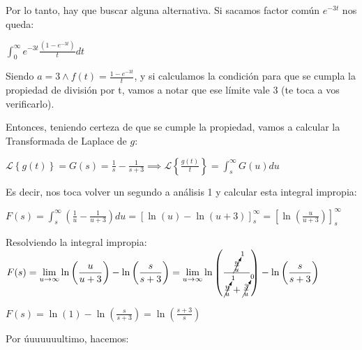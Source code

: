 \documentclass[11pt]{article}
\newcommand{\lapl}[1]{\mathscr{L} \left\lbrace {#1} \right\rbrace}
\begin{document}
	Por lo tanto, hay que buscar alguna alternativa. Si sacamos factor común $e^{-3t}$ nos queda:
	
	$\displaystyle \int_{0}^{\infty}e^{-3t}\frac{(1-e^{-3t})}{t}dt$
	
	Siendo $\displaystyle a=3 \wedge f(t)=\frac{1-e^{-3t}}{t}$, y si calculamos la condición para que se cumpla la propiedad de división por t, vamos a notar que ese límite vale 3 (te toca a vos verificarlo).
	
	Entonces, teniendo certeza de que se cumple la propiedad, vamos a calcular la Transformada de Laplace de $g$:
	
	$\displaystyle \lapl{g(t)}=G(s)=\frac{1}{s}-\frac{1}{s+3} \implies \lapl{\frac{g(t)}{t}}=\int_{s}^{\infty}G(u)du$
	
	Es decir, nos toca volver un segundo a análisis 1 y calcular esta integral impropia:
	
	$\displaystyle F(s)=\int_{s}^{\infty}\left( \frac{1}{u}-\frac{1}{u+3} \right)du = \left[\ln(u)-\ln(u+3)\right]_{s}^{\infty}=\left[\ln\left(\frac{u}{u+3}\right)\right]_{s}^{\infty}$
	
	Resolviendo la integral impropia:\\
	$\displaystyle F(s)=\lim\limits_{u\rightarrow \infty}\ln\left(\frac{u}{u+3}\right)-\ln\left(\frac{s}{s+3}\right)=\lim\limits_{u\rightarrow \infty} \ln\left(\frac{\cancelto{1}{\frac{u}{u}}}{\cancelto{1}{\frac{u}{u}}+\cancelto{0}{\frac{3}{u}}}\right) - \ln\left(\frac{s}{s+3}\right)$
	
	$\displaystyle F(s)=\ln(1)-\ln\left(\frac{s}{s+3}\right)=\ln\left(\frac{s+3}{s}\right)$
	
	Por úuuuuuultimo, hacemos: 
	
	
\end{document}
